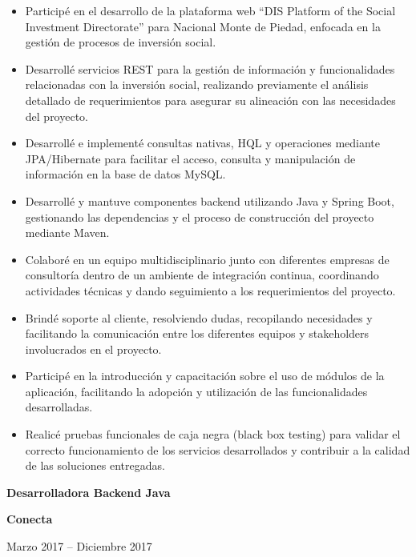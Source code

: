 \documentclass[10pt,letterpaper]{article}
\newcommand{\jobtitle}[1]{
    {\bfseries #1}
}
\newcommand{\company}[1]{
    {\bfseries\color{DarkGray} #1}
}
\newcommand{\jobdate}[1]{
    {\color{MediumGray} #1}
}
\begin{document}
\begin{itemize}

\item Participé en el desarrollo de la plataforma web ``DIS Platform of the Social Investment Directorate'' para Nacional Monte de Piedad, enfocada en la gestión de procesos de inversión social.

\item Desarrollé servicios REST para la gestión de información y funcionalidades relacionadas con la inversión social, realizando previamente el análisis detallado de requerimientos para asegurar su alineación con las necesidades del proyecto.

\item Desarrollé e implementé consultas nativas, HQL y operaciones mediante JPA/Hibernate para facilitar el acceso, consulta y manipulación de información en la base de datos MySQL.

\item Desarrollé y mantuve componentes backend utilizando Java y Spring Boot, gestionando las dependencias y el proceso de construcción del proyecto mediante Maven.

\item Colaboré en un equipo multidisciplinario junto con diferentes empresas de consultoría dentro de un ambiente de integración continua, coordinando actividades técnicas y dando seguimiento a los requerimientos del proyecto.

\item Brindé soporte al cliente, resolviendo dudas, recopilando necesidades y facilitando la comunicación entre los diferentes equipos y stakeholders involucrados en el proyecto.

\item Participé en la introducción y capacitación sobre el uso de módulos de la aplicación, facilitando la adopción y utilización de las funcionalidades desarrolladas.

\item Realicé pruebas funcionales de caja negra (black box testing) para validar el correcto funcionamiento de los servicios desarrollados y contribuir a la calidad de las soluciones entregadas.

\end{itemize}

\jobtitle{Desarrolladora Backend Java} \textbar{}
\company{Conecta}
\hfill \textbar{}
\jobdate{Marzo 2017 -- Diciembre 2017}
\end{document}
